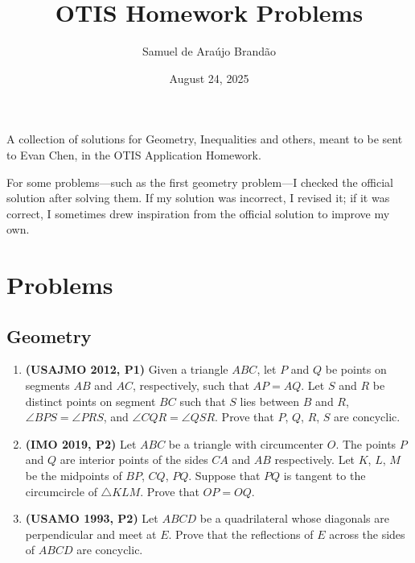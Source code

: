 \documentclass[12pt]{article}
\title{\sffamily\bfseries{OTIS Homework Problems}}
\author{Samuel de Araújo Brandão}
\date{August 24, 2025}
\begin{document}
  \maketitle

  A collection of solutions for Geometry, Inequalities and others, meant to be sent to Evan Chen, in the OTIS Application Homework.

  For some problems—such as the first geometry problem—I checked the official solution after solving them. If my solution was incorrect, I 
  revised it; if it was correct, I sometimes drew inspiration from the official solution to improve my own.

  \tableofcontents
  
  \clearpage
  
  \section{\textsf{Problems}}
    \subsection{Geometry}
      \begin{enumerate}[label=\textbf{A.\arabic*.}]
        \item \textbf{\textcolor{color2}{(USAJMO 2012, P1)}} Given a triangle $ABC$, let $P$ and $Q$ be points on segments $AB$ and $AC$, respectively, such
          that $AP = AQ$. Let $S$ and $R$ be distinct points on segment $BC$ such that $S$ lies between $B$ and $R$, $\angle BPS = \angle PRS$,
          and $\angle CQR = \angle QSR$. Prove that $P$, $Q$, $R$, $S$ are concyclic.

        \item \textbf{\textcolor{color2}{(IMO 2019, P2)}} Let $ABC$ be a triangle with circumcenter $O$. The points $P$ and $Q$ are interior points of the sides $CA$
          and $AB$ respectively. Let $K$, $L$, $M$ be the midpoints of $BP$, $CQ$, $PQ$. Suppose that $PQ$ is tangent to the circumcircle 
          of $\triangle KLM$. Prove that $OP = OQ$.

        \item \textbf{\textcolor{color2}{(USAMO 1993, P2)}} Let $ABCD$ be a quadrilateral whose diagonals are perpendicular and meet at $E$. Prove that the reflections
          of $E$ across the sides of $ABCD$ are concyclic.
      \end{enumerate}
\end{document}
